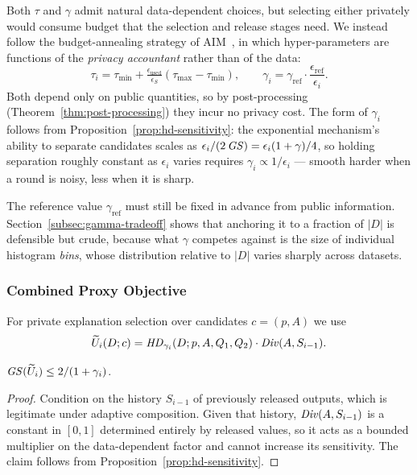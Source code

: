 Both $\tau$ and $\gamma$ admit natural data-dependent choices, but selecting either privately would consume budget that the selection and release stages need.
We instead follow the budget-annealing strategy of AIM~\cite{McKennaMSM22}, in which hyper-parameters are functions of the \emph{privacy accountant} rather than of the data:
\begin{equation}
\tau_i=\tau_{\min}+\tfrac{\epsilon_{\text{used}}}{\epsilon_S}\left(\tau_{\max}-\tau_{\min}\right),
\qquad
\gamma_i=\gamma_{\text{ref}}\cdot\frac{\epsilon_{\text{ref}}}{\epsilon_i}.
\label{eq:adaptive-params}
\end{equation}
Both depend only on public quantities, so by post-processing (Theorem~\ref{thm:post-processing}) they incur no privacy cost.
The form of $\gamma_i$ follows from Proposition~\ref{prop:hd-sensitivity}: the exponential mechanism's ability to separate candidates scales as $\epsilon_i/(2\,\mathit{GS})=\epsilon_i(1+\gamma)/4$, so holding separation roughly constant as $\epsilon_i$ varies requires $\gamma_i\propto 1/\epsilon_i$ --- smooth harder when a round is noisy, less when it is sharp.

The reference value $\gamma_{\text{ref}}$ must still be fixed in advance from public information.
Section~\ref{subsec:gamma-tradeoff} shows that anchoring it to a fraction of $|D|$ is defensible but crude, because what $\gamma$ competes against is the size of individual histogram \emph{bins}, whose distribution relative to $|D|$ varies sharply across datasets.

\subsubsection{Combined Proxy Objective}
\label{subsubsec:combined-proxy-objective}

For private explanation selection over candidates $c=(p,A)$ we use
\begin{equation}
\widetilde{U}_i(D;c)=\mathit{HD}_{\gamma_i}(D;p,A,Q_1,Q_2)\cdot \mathit{Div}(A,S_{i-1}).
\label{eq:selection-utility}
\end{equation}

\begin{proposition}
\label{prop:selection-utility-sensitivity}
$\mathit{GS}(\widetilde{U}_i)\le 2/(1+\gamma_i)$.
\end{proposition}

\begin{proof}
Condition on the history $S_{i-1}$ of previously released outputs, which is legitimate under adaptive composition.
Given that history, $\mathit{Div}(A,S_{i-1})$ is a constant in $[0,1]$ determined entirely by released values, so it acts as a bounded multiplier on the data-dependent factor and cannot increase its sensitivity.
The claim follows from Proposition~\ref{prop:hd-sensitivity}.
\end{proof}

